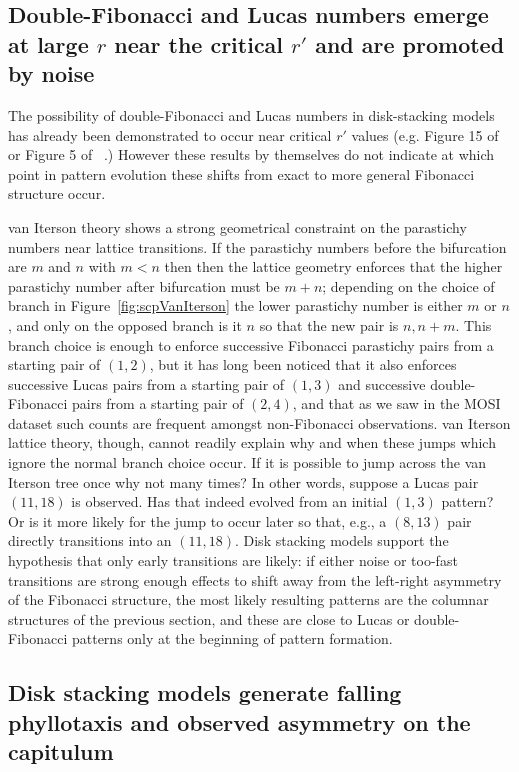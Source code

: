 \subsection{Double-Fibonacci and Lucas numbers emerge at large $r$ near the critical $r'$ and are promoted by noise}
The possibility of double-Fibonacci and Lucas numbers in disk-stacking models has already been demonstrated to occur near critical $r'$ values (e.g. Figure 15 of~\cite{goleFibonacciQuasisymmetricPhyllotaxis2016} or Figure 5 of ~\cite{yonekuraMathematicalModelStudies2019}.) However these results by themselves do not indicate at which point in pattern evolution these shifts from exact to more general Fibonacci structure occur. 

van Iterson theory shows a strong geometrical constraint on the parastichy numbers near lattice transitions. If the parastichy numbers before the bifurcation are $m$ and $n$ with $m<n$ then then the lattice geometry enforces that the higher parastichy number after bifurcation must be $m+n$; depending on the choice of branch in Figure~\ref{fig:scpVanIterson} the lower parastichy number is either $m$ or $n$, and only on the opposed branch is it $n$ so that the new pair is $n,n+m$. This branch choice is enough to enforce successive Fibonacci parastichy pairs from a starting pair of $(1,2)$, but it has long  been noticed that it also enforces successive Lucas pairs from a starting pair of $(1,3)$ and successive double-Fibonacci pairs from a starting pair of $(2,4)$, and that as we saw in the MOSI dataset such counts are frequent amongst non-Fibonacci observations. van Iterson lattice theory, though, cannot readily explain why and when these jumps which  ignore the normal branch choice occur.  If  it is possible to jump across the van Iterson tree once why not many times? In other words, suppose a Lucas pair $(11,18)$ is observed. Has that indeed evolved from an initial $(1,3)$ pattern? Or is it more likely for the jump to occur later so that, e.g., a $(8,13)$ pair directly transitions into an $(11,18)$. 
Disk stacking models support the hypothesis that only early transitions are likely: if either noise or too-fast transitions are strong enough effects to shift away from the left-right asymmetry of the  Fibonacci structure, the most likely resulting patterns are the columnar structures of the previous section, and these are close to Lucas or double-Fibonacci patterns only at the beginning of pattern formation. 


\subsection{Disk stacking models generate falling phyllotaxis and observed asymmetry on the capitulum}

